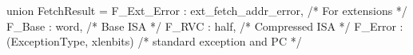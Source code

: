 union FetchResult = {
  F_Ext_Error : ext_fetch_addr_error,      /* For extensions */
  F_Base      : word,                      /* Base ISA */
  F_RVC       : half,                      /* Compressed ISA */
  F_Error     : (ExceptionType, xlenbits)  /* standard exception and PC */
}
